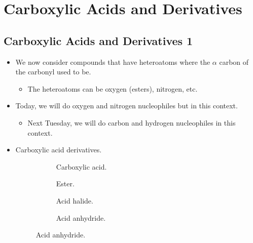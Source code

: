 \documentclass[../notes.tex]{subfiles}
\begin{document}
\chapter{Carboxylic Acids and Derivatives}
\section{Carboxylic Acids and Derivatives 1}
\begin{itemize}
    \item {}We now consider compounds that have heteroatoms where the $\alpha$ carbon of the carbonyl used to be.
    \begin{itemize}
        \item The heteroatoms can be oxygen (esters), nitrogen, etc.
    \end{itemize}
    \item Today, we will do oxygen and nitrogen nucleophiles but in this context.
    \begin{itemize}
        \item Next Tuesday, we will do carbon and hydrogen nucleophiles in this context.
    \end{itemize}
    \item Carboxylic acid derivatives.
    \begin{figure}[h!]
        \centering
        \footnotesize
        \begin{subfigure}[b]{0.19\linewidth}
            \centering
            \caption{Carboxylic acid.}
            \label{fig:carboxylicAcidDerivativesa}
        \end{subfigure}
        \begin{subfigure}[b]{0.19\linewidth}
            \centering
            \caption{Ester.}
            \label{fig:carboxylicAcidDerivativesb}
        \end{subfigure}
        \begin{subfigure}[b]{0.19\linewidth}
            \centering
            \caption{Acid halide.}
            \label{fig:carboxylicAcidDerivativesc}
        \end{subfigure}
        \begin{subfigure}[b]{0.19\linewidth}
            \centering
            \caption{Acid anhydride.}
            \label{fig:carboxylicAcidDerivativesd}
        \end{subfigure}

\end{figure}
\end{itemize}
\end{document}
